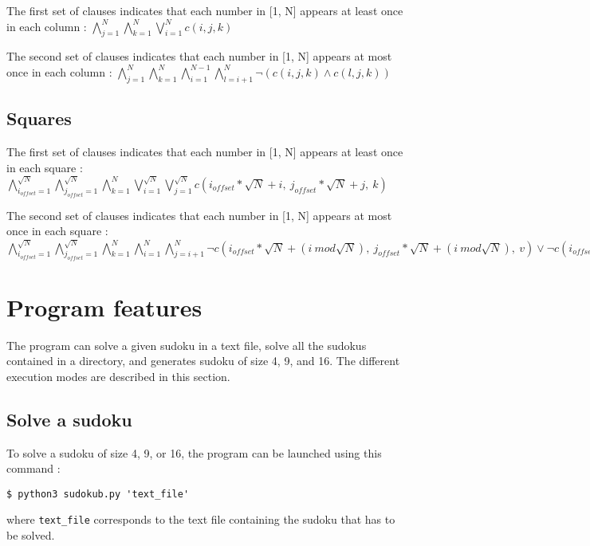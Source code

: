 \documentclass[a4paper, 11pt, oneside]{article}
\begin{document}
The first set of clauses indicates that each number in [1, N] appears at least once in each column :
$\bigwedge_{j=1}^{N} \bigwedge_{k=1}^{N} \bigvee_{i=1}^{N} c(i, j, k)$

The second set of clauses indicates that each number in [1, N] appears at most once in each column :
$\bigwedge_{j=1}^{N} \bigwedge_{k=1}^{N} \bigwedge_{i=1}^{N-1} \bigwedge_{l=i+1}^{N} \neg (c(i, j, k) \land c(l, j, k))$

\subsection{Squares}

The first set of clauses indicates that each number in [1, N] appears at least once in each square :
$\bigwedge_{i_{offset}=1}^{\sqrt{N}} \bigwedge_{j_{offset}=1}^{\sqrt{N}} \bigwedge_{k=1}^{N} \bigvee_{i=1}^{\sqrt{N}} \bigvee_{j=1}^{\sqrt{N}} c(i_{offset} * \sqrt{N} + i, \ j_{offset} * \sqrt{N} + j, \ k)$

The second set of clauses indicates that each number in [1, N] appears at most once in each square :
$\bigwedge_{i_{offset}=1}^{\sqrt{N}} \bigwedge_{j_{offset}=1}^{\sqrt{N}} \bigwedge_{k=1}^{N} \bigwedge_{i=1}^{N} \bigwedge_{j=i+1}^{N} \neg c(i_{offset} * \sqrt{N} + (i \ mod \sqrt{N}), \ j_{offset} * \sqrt{N} + (i \ mod \sqrt{N}), \ v) \lor \neg c(i_{offset} * \sqrt{N} + (j \ mod \sqrt{N}), \ j_{offset} * \sqrt{N} + (j \ mod \sqrt{N}), \ k)$

\section{Program features}

The program can solve a given sudoku in a text file, solve all the sudokus contained in a directory, and generates sudoku of size 4, 9, and 16. The different execution modes are described in this section.

\subsection{Solve a sudoku}

To solve a sudoku of size 4, 9, or 16, the program can be launched using this command : 
\begin{lstlisting}
$ python3 sudokub.py 'text_file'
\end{lstlisting}
where \texttt{text\_file} corresponds to the text file containing the sudoku that has to be solved.
\end{document}
